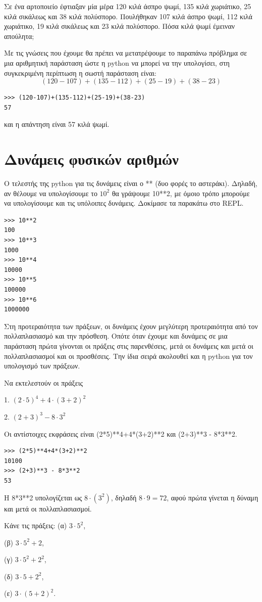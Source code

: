 \documentclass[b5paper,11pt,twoside,openleft]{memoir}
\begin{document}
\begin{exercise}
Σε ένα αρτοποιείο έφτιαξαν μία μέρα 120 κιλά άσπρο ψωμί, 135 κιλά χωριάτικο, 25 κιλά σικάλεως και 38 κιλά πολύσπορο. Πουλήθηκαν 107 κιλά άσπρο ψωμί, 112 κιλά χωριάτικο, 19 κιλά σικάλεως και 23 κιλά πολύσπορο. Πόσα κιλά ψωμί έμειναν απούλητα;
\end{exercise}
Με τις γνώσεις που έχουμε θα πρέπει να μετατρέψουμε το παραπάνω πρόβλημα σε μια αριθμητική παράσταση ώστε η python να μπορεί να την υπολογίσει, στη συγκεκριμένη περίπτωση η σωστή παράσταση είναι: $$(120-107)+(135-112)+(25-19)+(38-23)$$
\begin{lstlisting}
>>> (120-107)+(135-112)+(25-19)+(38-23)
57
\end{lstlisting}
και η απάντηση είναι 57 κιλά ψωμί.

\section{Δυνάμεις φυσικών αριθμών}
Ο τελεστής της python για τις δυνάμεις είναι ο **  (δυο φορές το αστεράκι). Δηλαδή, αν θέλουμε να υπολογίσουμε το $10^2$ θα γράψουμε 10**2, με όμοιο τρόπο μπορούμε να υπολογίσουμε και τις υπόλοιπες δυνάμεις. Δοκίμασε τα παρακάτω στο REPL.
\begin{lstlisting}
>>> 10**2
100
>>> 10**3
1000
>>> 10**4
10000
>>> 10**5
100000
>>> 10**6
1000000
\end{lstlisting}
Στη προτεραιότητα των πράξεων, οι δυνάμεις έχουν μεγλύτερη προτεραιότητα από τον πολλαπλασιασμό και την πρόσθεση. Οπότε όταν έχουμε και δυνάμεις σε μια παράσταση πρώτα γίνονται οι πράξεις στις παρενθέσεις, μετά οι δυνάμεις και μετά οι πολλαπλασιασμοί και οι προσθέσεις. Την ίδια σειρά ακολουθεί και η python για τον υπολογισμό των πράξεων.
\begin{exercise}
Να εκτελεστούν οι πράξεις 

 1. $(2\cdot 5)^4+4\cdot (3+2)^2$

 2. $(2+3)^3 - 8\cdot 3^2$

\end{exercise}
Οι αντίστοιχες εκφράσεις είναι (2*5)**4+4*(3+2)**2 και (2+3)**3 - 8*3**2.

\begin{lstlisting}
>>> (2*5)**4+4*(3+2)**2
10100
>>> (2+3)**3 - 8*3**2
53
\end{lstlisting}
H 8*3**2 υπολογίζεται ως $8\cdot (3^2)$, δηλαδή $8\cdot 9 = 72$, αφού πρώτα γίνεται η δύναμη και μετά οι πολλαπλασιασμοί.

\begin{exercise}
Κάνε τις πράξεις: 
(α) $3\cdot 5^2$, 

(β) $3\cdot 5^2 + 2$, 

(γ) $3\cdot5^2 + 2^2$, 

(δ) $3\cdot 5 + 2^2$, 

(ε) $3\cdot(5 + 2)^2$.
\end{exercise}
\end{document}
